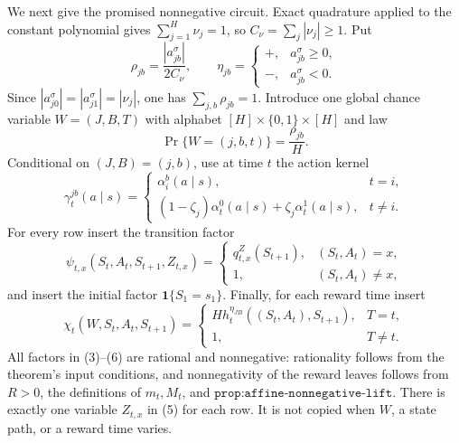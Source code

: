 We next give the promised nonnegative circuit.  Exact quadrature applied to the constant polynomial gives \(\sum_{j=1}^H\nu_j=1\), so \(C_\nu=\sum_j|\nu_j|\ge1\).  Put
\[
 \rho_{jb}=\frac{|a_{jb}^\sigma|}{2C_\nu},
 \qquad
 \eta_{jb}=
 \begin{cases}
 +,&a_{jb}^\sigma\ge0,\\
 -,&a_{jb}^\sigma<0.
 \end{cases}
\]
Since \(|a_{j0}^\sigma|=|a_{j1}^\sigma|=|\nu_j|\), one has \(\sum_{j,b}\rho_{jb}=1\).  Introduce one global chance variable \(W=(J,B,T)\) with alphabet \([H]\times\{0,1\}\times[H]\) and law
\[
 \Pr\{W=(j,b,t)\}=\frac{\rho_{jb}}{H}.
 \tag{3}
\]
Conditional on \((J,B)=(j,b)\), use at time \(t\) the action kernel
\[
 \gamma_t^{jb}(a\mid s)=
 \begin{cases}
 \alpha_i^b(a\mid s),&t=i,\\
 (1-\zeta_j)\alpha_t^0(a\mid s)+\zeta_j\alpha_t^1(a\mid s),&t\ne i.
 \end{cases}
 \tag{4}
\]
For every row insert the transition factor
\[
 \psi_{t,x}(S_t,A_t,S_{t+1},Z_{t,x})=
 \begin{cases}
 q^{Z}_{t,x}(S_{t+1}),&(S_t,A_t)=x,\\
 1,&(S_t,A_t)\ne x,
 \end{cases}
 \tag{5}
\]
and insert the initial factor \(\mathbf 1\{S_1=s_1\}\).  Finally, for each reward time insert
\[
 \chi_t(W,S_t,A_t,S_{t+1})=
 \begin{cases}
 Hh_t^{\eta_{JB}}((S_t,A_t),S_{t+1}),&T=t,\\
 1,&T\ne t.
 \end{cases}
 \tag{6}
\]
All factors in (3)--(6) are rational and nonnegative: rationality follows from the theorem's input conditions, and nonnegativity of the reward leaves follows from \(R>0\), the definitions of \(m_t,M_t\), and \(\texttt{prop:affine-nonnegative-lift}\).  There is exactly one variable \(Z_{t,x}\) in (5) for each row.  It is not copied when \(W\), a state path, or a reward time varies.

